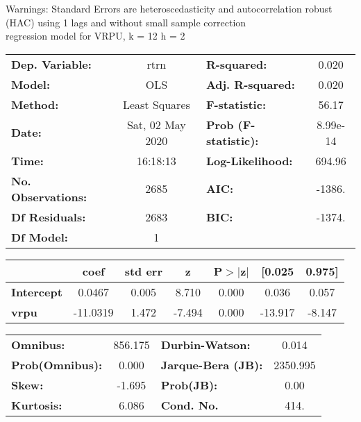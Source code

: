 Warnings: \newline
 [1] Standard Errors are heteroscedasticity and autocorrelation robust (HAC) using 1 lags and without small sample correction\\ 

regression model for VRPU, k = 12 h = 2\begin{center}
\begin{tabular}{lclc}
\toprule
\textbf{Dep. Variable:}    &       rtrn       & \textbf{  R-squared:         } &     0.020   \\
\textbf{Model:}            &       OLS        & \textbf{  Adj. R-squared:    } &     0.020   \\
\textbf{Method:}           &  Least Squares   & \textbf{  F-statistic:       } &     56.17   \\
\textbf{Date:}             & Sat, 02 May 2020 & \textbf{  Prob (F-statistic):} &  8.99e-14   \\
\textbf{Time:}             &     16:18:13     & \textbf{  Log-Likelihood:    } &    694.96   \\
\textbf{No. Observations:} &        2685      & \textbf{  AIC:               } &    -1386.   \\
\textbf{Df Residuals:}     &        2683      & \textbf{  BIC:               } &    -1374.   \\
\textbf{Df Model:}         &           1      & \textbf{                     } &             \\
\bottomrule
\end{tabular}
\begin{tabular}{lcccccc}
                   & \textbf{coef} & \textbf{std err} & \textbf{z} & \textbf{P$> |$z$|$} & \textbf{[0.025} & \textbf{0.975]}  \\
\midrule
\textbf{Intercept} &       0.0467  &        0.005     &     8.710  &         0.000        &        0.036    &        0.057     \\
\textbf{vrpu}      &     -11.0319  &        1.472     &    -7.494  &         0.000        &      -13.917    &       -8.147     \\
\bottomrule
\end{tabular}
\begin{tabular}{lclc}
\textbf{Omnibus:}       & 856.175 & \textbf{  Durbin-Watson:     } &    0.014  \\
\textbf{Prob(Omnibus):} &   0.000 & \textbf{  Jarque-Bera (JB):  } & 2350.995  \\
\textbf{Skew:}          &  -1.695 & \textbf{  Prob(JB):          } &     0.00  \\
\textbf{Kurtosis:}      &   6.086 & \textbf{  Cond. No.          } &     414.  \\
\bottomrule
\end{tabular}
\end{center}

